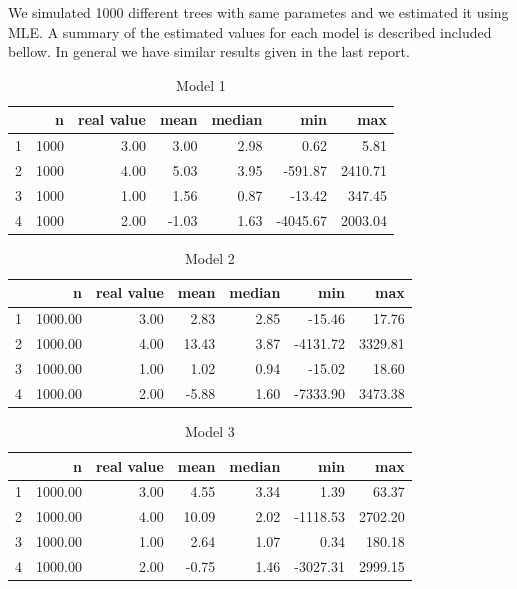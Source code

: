 \documentclass[11pt]{article} %
\begin{document}
We simulated 1000 different trees with same parametes and we estimated it using MLE. A summary of the estimated values for each model is described included bellow. In general we have similar results given in the last report. 


\begin{table}[ht]
\centering
\begin{tabular}{rrrrrrr}
  \hline
 & n & real value & mean & median & min & max \\ 
  \hline
1 & 1000 & 3.00 & 3.00 & 2.98 & 0.62 & 5.81 \\ 
  2 & 1000 & 4.00 & 5.03 & 3.95 & -591.87 & 2410.71 \\ 
  3 & 1000 & 1.00 & 1.56 & 0.87 & -13.42 & 347.45 \\ 
  4 & 1000 & 2.00 & -1.03 & 1.63 & -4045.67 & 2003.04 \\ 
   \hline
\end{tabular}
\caption{Model 1}
\end{table}

\begin{table}[ht]
\centering
\begin{tabular}{rrrrrrr}
  \hline
 & n & real value & mean & median & min & max \\ 
  \hline
1 & 1000.00 & 3.00 & 2.83 & 2.85 & -15.46 & 17.76 \\ 
  2 & 1000.00 & 4.00 & 13.43 & 3.87 & -4131.72 & 3329.81 \\ 
  3 & 1000.00 & 1.00 & 1.02 & 0.94 & -15.02 & 18.60 \\ 
  4 & 1000.00 & 2.00 & -5.88 & 1.60 & -7333.90 & 3473.38 \\ 
   \hline
\end{tabular}
\caption{Model 2}
\end{table}


\begin{table}[ht]
\centering
\begin{tabular}{rrrrrrr}
  \hline
 & n & real value & mean & median & min & max \\ 
  \hline
1 & 1000.00 & 3.00 & 4.55 & 3.34 & 1.39 & 63.37 \\ 
  2 & 1000.00 & 4.00 & 10.09 & 2.02 & -1118.53 & 2702.20 \\ 
  3 & 1000.00 & 1.00 & 2.64 & 1.07 & 0.34 & 180.18 \\ 
  4 & 1000.00 & 2.00 & -0.75 & 1.46 & -3027.31 & 2999.15 \\ 
   \hline
\end{tabular}
\caption{Model 3}
\end{table}
\newpage
\end{document}
